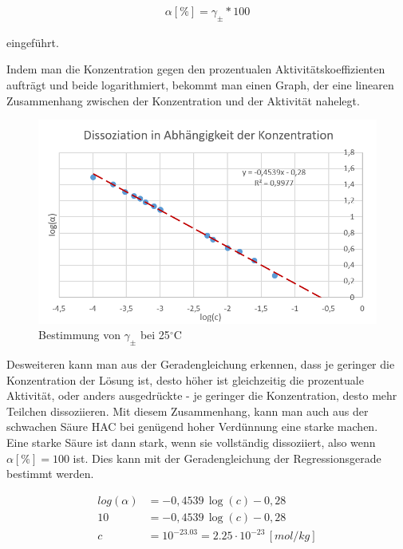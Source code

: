\begin{align}
    \alpha[\%] = \gamma_\pm *100
\end{align}

eingeführt.

 

Indem man die Konzentration gegen den prozentualen Aktivitätskoeffizienten aufträgt und beide logarithmiert, bekommt man einen Graph, der 
eine linearen Zusammenhang zwischen der Konzentration und der Aktivität nahelegt. 

\begin{figure}[H]
    \centering
    \includegraphics[scale=.7]{../src/img/graph1_25C.png}
    \caption{Bestimmung von $\gamma_\pm$ bei 25$^\circ$C}
\end{figure}

Desweiteren kann man aus der Geradengleichung erkennen, dass je geringer die Konzentration der Lösung ist, desto höher ist gleichzeitig
die prozentuale Aktivität, oder anders ausgedrückte - je geringer die Konzentration, desto mehr Teilchen dissoziieren.
Mit diesem Zusammenhang, kann man auch aus der schwachen Säure HAC bei genügend hoher Verdünnung eine starke machen. \\
Eine starke Säure ist dann stark, wenn sie vollständig dissoziiert, also wenn $\alpha[\%] = 100$ ist. Dies kann mit der Geradengleichung der
Regressionsgerade bestimmt werden.

\begin{align*}
    log(\alpha) &= -0,4539 \, \log(c) - 0,28 \\
    10 &= -0,4539 \, \log(c) - 0,28  \\
    c &= 10^{-23.03} = 2.25 \cdot 10^{-23} \, [mol/kg]
\end{align*}


